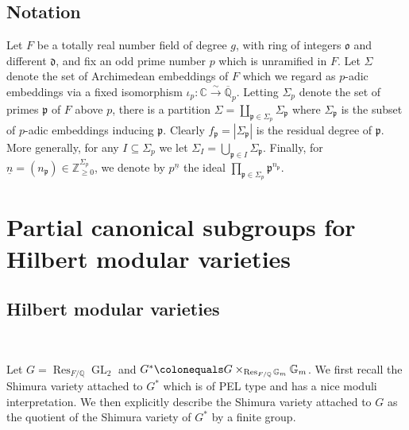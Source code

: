 \documentclass[11pt]{amsart}
\theoremstyle{definition} %
\theoremstyle{plain} %
\theoremstyle{remark} %
\newcommand{\CC}{\mathbb C}
\newcommand{\QQ}{{\mathbb Q}}
\newcommand{\ZZ}{{\mathbb Z}}
\newcommand{\frakd}{\mathfrak d}
\newcommand{\frako}{\mathfrak o}
\newcommand{\frakp}{\mathfrak p}
\newcommand{\Qbar}{\overline{\QQ}}
\newcommand{\Qpbar}{\Qbar_p}
\newcommand{\defeq}{\colonequals} %
\DeclareMathOperator\GL{GL} %
\newcommand{\Gm}{\mathbb{G}_m} %
\DeclareMathOperator\Res{Res} %
\begin{document}
\tableofcontents

\subsection*{Notation}
Let  $F$ be a  totally real  number field of degree $g$, with ring of integers $\frako$ and different $\frakd$, and  
fix an odd  prime number $p$ which is unramified in $F$. 
Let $\Sigma$ denote the set of Archimedean embeddings of $F$ which we regard as $p$-adic embeddings via a fixed isomorphism $\iota_p\colon\CC\xrightarrow{\sim}\Qpbar$. 
Letting $\Sigma_p$ denote the set of primes $\frakp$ of $F$ above $p$, there is a partition 
$\Sigma=\coprod_{\frakp\in \Sigma_p}\Sigma_{\frakp}$ where $\Sigma_{\frakp}$ is the subset of $p$-adic embeddings inducing $\frakp$. Clearly $ f_\frakp=|\Sigma_\frakp|$ is the residual degree of $\frakp$.
More generally, for any $I\subseteq \Sigma_p$ we let $\Sigma_I = \bigcup_{\frakp\in I} \Sigma_\frakp$. Finally, for $\underline{n} = (n_\frakp) \in \ZZ_{\geqslant 0}^{\Sigma_p}$, we  
denote by $p^{\underline{n}}$ the ideal $\prod_{\frakp\in \Sigma_p} \frakp^{n_\frakp}$.


\section{Partial canonical subgroups for Hilbert modular varieties}

\subsection{Hilbert modular varieties} \label{HMV} \

Let $G = \Res_{F/\QQ}\GL_2$ and $G^\ast\defeq G\times_{\Res_{F/\QQ}\Gm}\Gm$.
We first recall the Shimura variety attached to $G^\ast$ which is of PEL type and has a nice moduli interpretation. 
We then explicitly describe the Shimura variety attached to $G$ as the quotient of the Shimura variety of $G^\ast$ by a finite group. 
\end{document}
